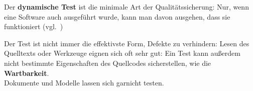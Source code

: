 \begin{tcolorbox}
    Der \textbf{dynamische Test} ist die minimale Art der Qualitätssicherung: Nur, wenn eine Software auch ausgeführt wurde, kann man davon ausgehen, dass sie funktioniert (vgl.~\cite[9]{Wed09c})
\end{tcolorbox}
\vspace{2mm}

\noindent
Der Test ist nicht immer die effektivste Form, Defekte zu verhindern: Lesen des Quelltexts oder Werkzeuge eignen sich oft sehr gut: Ein Test kann außerdem nicht bestimmte Eigenschaften des Quellcodes sicherstellen, wie die \textbf{Wartbarkeit}.\\
Dokumente und Modelle lassen sich garnicht testen.
